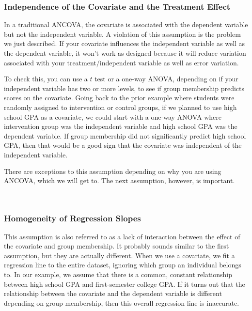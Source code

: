 \documentclass[
  letterpaper,
  DIV=11,
  numbers=noendperiod]{scrreprt}
\begin{document}
\subsubsection*{Independence of the Covariate and the Treatment
Effect\,}\label{independence-of-the-covariate-and-the-treatment-effect}

In a traditional ANCOVA, the covariate is associated with the dependent
variable but not the independent variable. A violation of this
assumption is the problem we just described. If your covariate
influences the independent variable as well as the dependent variable,
it won't work as designed because it will reduce variation associated
with your treatment/independent variable as well as error variation.\,\,

To check this, you can use a \(t\) test or a one-way ANOVA, depending on
if your independent variable has two or more levels, to see if group
membership predicts scores on the covariate. Going back to the prior
example where students were randomly assigned to intervention or control
groups, if we planned to use high school GPA as a covariate, we could
start with a one-way ANOVA where intervention group was the independent
variable and high school GPA was the dependent variable. If group
membership did not significantly predict high school GPA, then that
would be a good sign that the covariate was independent of the
independent variable.\,\,

There are exceptions to this assumption depending on why you are using
ANCOVA, which we will get to. The next assumption, however, is
important.\,

\,

\subsubsection*{Homogeneity of Regression
Slopes\,}\label{homogeneity-of-regression-slopes}

This assumption is also referred to as a lack of interaction between the
effect of the covariate and group membership. It probably sounds similar
to the first assumption, but they are actually different. When we use a
covariate, we fit a regression line to the entire dataset, ignoring
which group an individual belongs to. In our example, we assume that
there is a common, constant relationship between high school GPA and
first-semester college GPA. If it turns out that the relationship
between the covariate and the dependent variable is different depending
on group membership, then this overall regression line is inaccurate.\,
\end{document}
